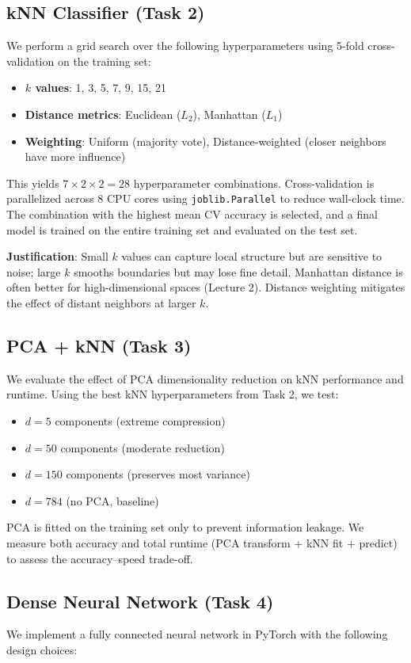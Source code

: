 \documentclass[11pt]{article}
\begin{document}
\subsection{kNN Classifier (Task 2)}
We perform a grid search over the following hyperparameters using 5-fold cross-validation on the training set:
\begin{itemize}[nosep]
	\item \textbf{$k$ values}: 1, 3, 5, 7, 9, 15, 21
	\item \textbf{Distance metrics}: Euclidean ($L_2$), Manhattan ($L_1$)
	\item \textbf{Weighting}: Uniform (majority vote), Distance-weighted (closer neighbors have more influence)
\end{itemize}
This yields $7 \times 2 \times 2 = 28$ hyperparameter combinations. Cross-validation is parallelized across 8 CPU cores using \texttt{joblib.Parallel} to reduce wall-clock time. The combination with the highest mean CV accuracy is selected, and a final model is trained on the entire training set and evaluated on the test set.

\textbf{Justification}: Small $k$ values can capture local structure but are sensitive to noise; large $k$ smooths boundaries but may lose fine detail. Manhattan distance is often better for high-dimensional spaces (Lecture 2). Distance weighting mitigates the effect of distant neighbors at larger $k$.

\subsection{PCA + kNN (Task 3)}
We evaluate the effect of PCA dimensionality reduction on kNN performance and runtime. Using the best kNN hyperparameters from Task 2, we test:
\begin{itemize}[nosep]
	\item $d = 5$ components (extreme compression)
	\item $d = 50$ components (moderate reduction)
	\item $d = 150$ components (preserves most variance)
	\item $d = 784$ (no PCA, baseline)
\end{itemize}
PCA is fitted on the training set only to prevent information leakage. We measure both accuracy and total runtime (PCA transform + kNN fit + predict) to assess the accuracy--speed trade-off.

\subsection{Dense Neural Network (Task 4)}
We implement a fully connected neural network in PyTorch with the following design choices:
\end{document}
